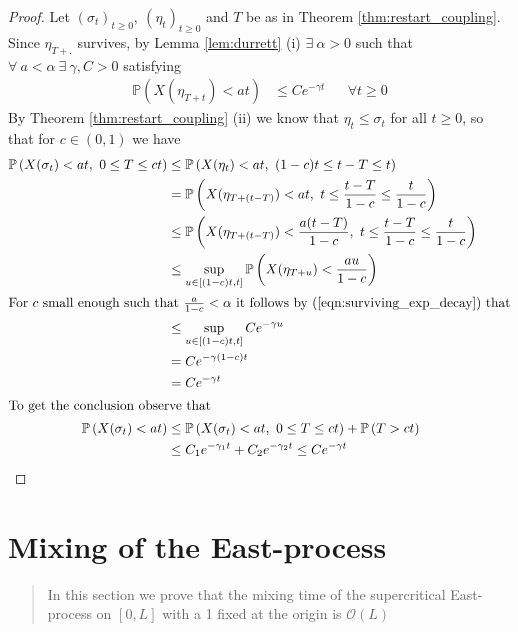 \documentclass{article}
\theoremstyle{slimTheoremStyle} %
\theoremstyle{slimDefinitionStyle}
\theoremstyle{remark}
\renewcommand{\cal}[1]{\mathcal{#1}}
\renewcommand{\Pr}[1]{\mathbb{P} \left( #1 \right)}
\begin{document}
\begin{proof}
Let $(\sigma_t)_{t \geq 0},\ (\eta_t)_{t \geq 0}$ and $T$ be as in Theorem \ref{thm:restart_coupling}. Since $\eta_{T + .}$ survives, by Lemma \ref{lem:durrett} (i) $\exists\ \alpha > 0$ such that $\forall\ a < \alpha\ \exists\ \gamma, C > 0$ satisfying 
\begin{align}\label{eqn:surviving_exp_decay}
  \Pr{X(\eta_{T+t}) < at} &\leq C e^{- \gamma t}  &&\forall t \geq 0
\end{align}
By Theorem \ref{thm:restart_coupling} (ii) we know that $\eta_t \leq \sigma_t$ for all $t \geq 0$, so that for $c \in (0,1)$ we have
\begin{align*}
  \Pr{X(\sigma_t) < at,\ 0 \leq T \leq ct} &\leq \Pr{X(\eta_t) < at,\ (1-c)t \leq t-T \leq t} \\
                                           &=    \Pr{X(\eta_{T + (t - T)}) < at,\ t \leq \frac{t-T}{1-c} \leq \frac{t}{1-c}} \\
                                           &\leq \Pr{X(\eta_{T + (t - T)}) < \frac{a(t - T)}{1-c},\ t \leq \frac{t-T}{1-c} \leq \frac{t}{1-c}} \\
                                           &\leq \sup\limits_{u \in [(1-c)t,t]} \Pr{X(\eta_{T + u}) < \frac{au}{1-c}} \\
  \intertext{For $c$ small enough such that $\frac{a}{1-c} < \alpha$ it follows by (\ref{eqn:surviving_exp_decay}) that}
                                           &\leq \sup\limits_{u \in [(1-c)t,t]} C e^{-\gamma u} \\
                                           &= C e^{-\gamma (1-c) t} \\
                                           &= C e^{-\gamma t} \\ 
  \intertext{To get the conclusion observe that}
    \Pr{X(\sigma_t) < at}  &\leq \Pr{X(\sigma_t) < at,\ 0 \leq T \leq ct} + \Pr{T > ct} \\
                            &\leq C_1 e^{-\gamma_1 t} + C_2 e^{-\gamma_2 t} \leq C e^{-\gamma t}
\end{align*}
\end{proof}

\section{Mixing of the East-process}
\begin{quote}
{\small In this section we prove that the mixing time of the supercritical East-process on $[0, L]$ with a 1 fixed at the origin is $\cal{O}(L)$}
\end{quote}
\end{document}
